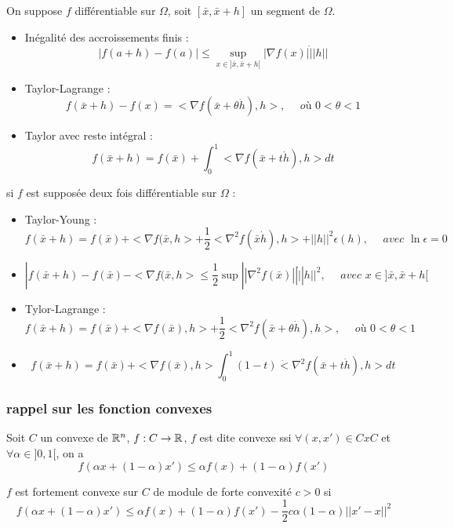 	On suppose $f$ différentiable sur $\Omega$, soit $[\bar{x}, \bar{x}+h]$ un segment de $\Omega$.
	\begin{itemize}
		\item Inégalité des accroissements finis : \[|f(a+h) -f(a)| \leq \sup_{ x \in ]\bar{x}, \bar{x}+h[ } |\nabla f(x)| \dot ||h||\]
		\item Taylor-Lagrange : \[f(\bar{x}+h) - f(x) = <\nabla f(\bar{x}+\theta \dot h), h>, \quad \textit{ où } 0<\theta <1\]
		\item Taylor avec reste intégral : \[f(\bar{x}+h) = f(\bar{x}) + \int_0^1 <\nabla f(\bar{x}+ t \dot h), h> dt\]
	\end{itemize}
	si $f$ est supposée deux fois différentiable sur $\Omega$ :
	\begin{itemize}
		\item Taylor-Young : \[f(\bar{x}+h) = f(\bar{x}) + <\nabla f(\bar{x}, h> + \frac{1}{2} <\nabla^2 f(\bar{x} \dot h), h> + ||h||^2 \epsilon (h), \quad \textit{ avec } \ln \epsilon = 0\]
		\item \[|f(\bar{x}+h) - f(\bar{x}) - <\nabla f(\bar{x}, h> \leq \frac{1}{2} \sup || \nabla^2 f(\bar{x})|| \dot ||h||^2, \quad \textit{ avec } x \in ]\bar{x}, \bar{x}+h[\]
		\item Tylor-Lagrange : \[f(\bar{x}+h) = f(\bar{x}) + <\nabla f(\bar{x}), h> + \frac{1}{2} <\nabla^2 f(\bar{x}+ \theta \dot h), h>, \quad \textit{ où } 0< \theta <1\]
		\item \[f(\bar{x}+h) = f(\bar{x}) + <\nabla f(\bar{x}), h> \int_0^1 (1-t) \dot <\nabla^2 f(\bar{x}+ t \dot h), h> dt\]
	\end{itemize}
	
		\subsubsection{rappel sur les fonction convexes}
		
		\begin{definition}
		Soit $C$ un convexe de $\mathbb{R}^n$, $f:C\rightarrow \mathbb{R}$, $f$ est dite convexe ssi $\forall (x, x') \in C x C$ et $\forall \alpha \in ]0,1[$, on a \[f(\alpha x + (1-\alpha) x') \leq \alpha f(x) + (1-\alpha) f(x')\]
		\end{definition}
		
		\begin{definition}
		$f$ est fortement convexe sur $C$ de module de forte convexité $c>0$ si \[f(\alpha x + (1-\alpha) x') \leq \alpha f(x) + (1-\alpha) f(x') -\frac{1}{2} c \alpha (1-\alpha) ||x'-x||^2\]
		\end{definition}
		
